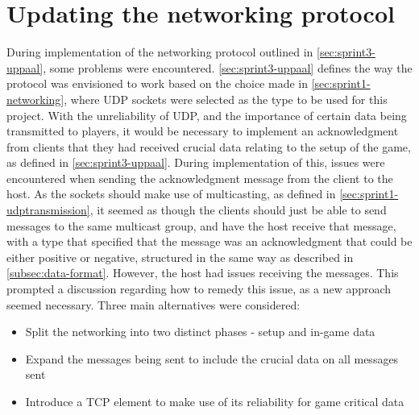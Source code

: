 \section{Updating the networking protocol}
During implementation of the networking protocol outlined in \autoref{sec:sprint3-uppaal}, some problems were encountered.
\autoref{sec:sprint3-uppaal} defines the way the protocol was envisioned to work based on the choice made in \autoref{sec:sprint1-networking}, where UDP sockets were selected as the type to be used for this project.
With the unreliability of UDP, and the importance of certain data being transmitted to players, it would be necessary to implement an acknowledgment from clients that they had received crucial data relating to the setup of the game, as defined in \autoref{sec:sprint3-uppaal}.
During implementation of this, issues were encountered when sending the acknowledgment message from the client to the host.
As the sockets should make use of multicasting, as defined in \autoref{sec:sprint1-udptransmission}, it seemed as though the clients should just be able to send messages to the same multicast group, and have the host receive that message, with a type that specified that the message was an acknowledgment that could be either positive or negative, structured in the same way as described in \autoref{subsec:data-format}.
However, the host had issues receiving the messages.
This prompted a discussion regarding how to remedy this issue, as a new approach seemed necessary.
Three main alternatives were considered:
\begin{itemize}
    \item Split the networking into two distinct phases - setup and in-game data
    \item Expand the messages being sent to include the crucial data on all messages sent
    \item Introduce a TCP element to make use of its reliability for game critical data
\end{itemize}

